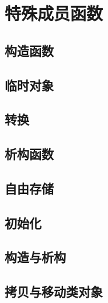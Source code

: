 
\chapter{特殊成员函数}

\section{构造函数}
\section{临时对象}
\section{转换}
\section{析构函数}
\section{自由存储}
\section{初始化}
\section{构造与析构}
\section{拷贝与移动类对象}
